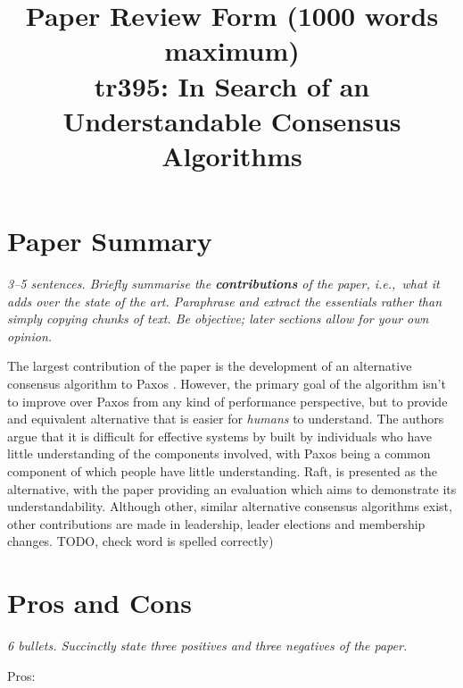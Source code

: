 \documentclass[11pt]{article}
\begin{document}

\title{Paper Review Form (1000 words maximum)\\
    tr395: In Search of an Understandable Consensus Algorithms \cite{Raft}}

\maketitle

\section*{Paper Summary}

\textsl{3--5 sentences. Briefly summarise the {\bf contributions} of the paper,
i.e.,~what it adds over the state of the art. Paraphrase and extract the
essentials rather than simply copying chunks of text. Be objective; later
sections allow for your own opinion.}

The largest contribution of the paper is the development of an alternative
consensus algorithm to Paxos \cite{Paxos}. However, the primary goal of the
algorithm isn't to improve over Paxos from any kind of performance perspective,
but to provide and equivalent alternative that is easier for \textit{humans} to
understand. The authors argue that it is difficult for effective systems by
built by individuals who have little understanding of the components involved,
with Paxos being a common component of which people have little understanding.
Raft, is presented as the alternative, with the paper providing an evaluation
which aims to demonstrate its understandability. Although other, similar
alternative consensus algorithms exist, other contributions are made in
leadership, leader elections and membership changes. TODO, check word is
spelled correctly)

\section*{Pros and Cons}

\textsl{6 bullets. Succinctly state three positives and three negatives of the
paper.}

Pros:
\end{document}
